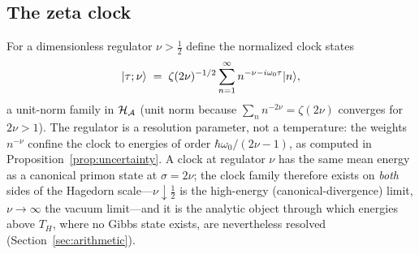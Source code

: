 \subsection{The zeta clock}

\begin{definition}\label{def:clock}
For a dimensionless regulator $\nu>\tfrac12$ define the normalized clock states
\begin{equation}\label{eq:clockstates}
\lvert \tau;\nu\rangle\;=\;\zeta(2\nu)^{-1/2}\sum_{n=1}^{\infty}n^{-\nu-i\omega_{0}\tau}\lvert n\rangle,
\end{equation}
a unit-norm family in $\mathcal{H}_{\mathcal{A}}$ (unit norm because $\sum_{n}n^{-2\nu}=\zeta(2\nu)$
converges for $2\nu>1$). The regulator is a resolution parameter, not a temperature: the
weights $n^{-\nu}$ confine the clock to energies of order
$\hbar\omega_{0}/(2\nu-1)$, as computed in Proposition~\ref{prop:uncertainty}. A clock at
regulator $\nu$ has the same mean energy as a canonical primon state at $\sigma=2\nu$; the
clock family therefore exists on \emph{both} sides of the Hagedorn scale---$\nu\downarrow\tfrac12$
is the high-energy (canonical-divergence) limit, $\nu\to\infty$ the vacuum limit---and it is
the analytic object through which energies above $T_{H}$, where no Gibbs state exists, are
nevertheless resolved (Section~\ref{sec:arithmetic}).
\end{definition}

